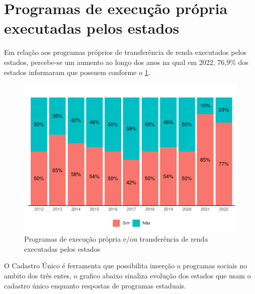 \documentclass[
  brazilian]{report}
\begin{document}
\hypertarget{programas-de-execuuxe7uxe3o-pruxf3pria-executadas-pelos-estados}{%
\section{Programas de execução própria executadas pelos
estados}\label{programas-de-execuuxe7uxe3o-pruxf3pria-executadas-pelos-estados}}

Em relação aos programas próprios de transferência de renda executados
pelos estados, percebe-se um aumento ao longo dos anos na qual em 2022,
76,9\% dos estados informaram que possuem conforme o
\cref{fig:be_uf_renda}.

\begin{figure}
\includegraphics{Censo-SUAS-2022_files/figure-latex/be_uf_renda-1} \caption[Programas de execução própria e/ou transferência de renda executadas pelos estados]{Programas de execução própria e/ou transferência de renda executadas pelos estados}\label{fig:be_uf_renda}
\end{figure}

O Cadastro Único é ferramenta que possibilita inserção a programas
sociais no ambito dos três entes, o grafico abaixo sinaliza evolução dos
estados que usam o cadastro único enquanto respostas de programas
estaduais.
\end{document}
